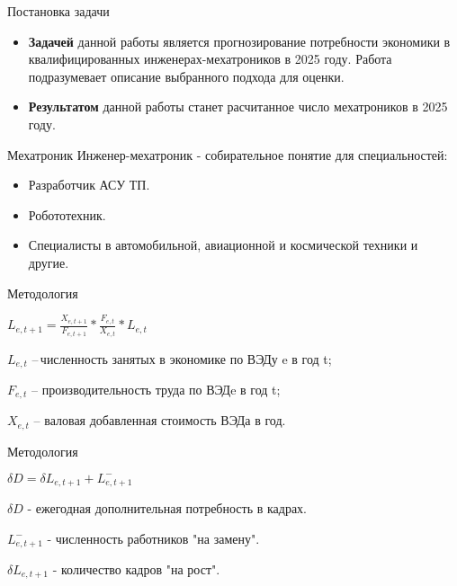 


\begin{frame}[noframenumbering]
	\titlepage
\end{frame}


\begin{frame}{Постановка задачи}
	\begin{itemize}
		\item \textbf{Задачей} данной работы является прогнозирование потребности экономики в квалифицированных инженерах-мехатроников в 2025 году. Работа подразумевает 
		описание выбранного подхода для оценки.
		
		\item \textbf{Результатом} данной работы станет расчитанное число мехатроников в 2025 году.
	\end{itemize}
\end{frame}

\begin{frame}{Мехатроник}
	Инженер-мехатроник - собирательное понятие для специальностей:
	\begin{itemize}
		\item Разработчик АСУ ТП.
		\item Робототехник.
		\item Специалисты в автомобильной, авиационной и космической техники и другие.
	\end{itemize}
\end{frame}

\begin{frame}{Методология} 

	\begin{center}
		\LARGE
		$L_{e, t+1} = \frac{X_{e, t+1}}{F_{e, t+1}} * \frac{F_{e, t}}{X_{e, t}} * L_{e, t}$
	\end{center}
	\par
	$L_{e,t}$ – численность занятых в экономике по ВЭДу e в год t;
	\par
	$F_{e,t}$ – производительность труда по ВЭДe в год t; 
	\par
	$X_{e,t}$ – валовая добавленная стоимость  ВЭДа в год.

\end{frame}

\begin{frame}{Методология} 
	
	\par
	\begin{center}
		\LARGE
		$\delta D = \delta L_{e, t+1} + L_{e, t+1}^{-}$
	\end{center}
	\par
	$\delta D$ - ежегодная дополнительная потребность в кадрах.
	\par
	$L_{e, t+1}^{-}$ - численность работников "на замену".
	\par
	$\delta L_{e, t+1}$ - количество кадров "на рост".
\end{frame}

